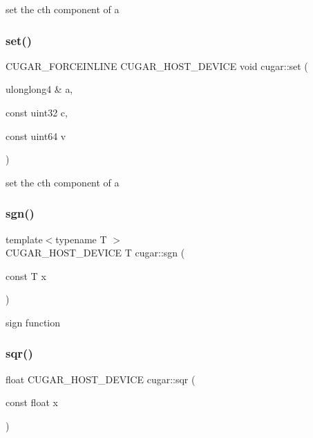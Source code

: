 set the c\textquotesingle{}th component of a \mbox{\label{group___basic_gac0bd2f6d0e83bfeddcd301d63e0bc750}} 
\subsubsection{\texorpdfstring{set()}{set()}\hspace{0.1cm}{\footnotesize\ttfamily [4/4]}}
{\footnotesize\ttfamily C\+U\+G\+A\+R\+\_\+\+F\+O\+R\+C\+E\+I\+N\+L\+I\+NE C\+U\+G\+A\+R\+\_\+\+H\+O\+S\+T\+\_\+\+D\+E\+V\+I\+CE void cugar\+::set (\begin{DoxyParamCaption}\item[{ulonglong4 \&}]{a,  }\item[{const uint32}]{c,  }\item[{const uint64}]{v }\end{DoxyParamCaption})}

set the c\textquotesingle{}th component of a \mbox{\label{group___basic_gaf4597603074c709d435ea876eac59e1b}} 
\subsubsection{\texorpdfstring{sgn()}{sgn()}}
{\footnotesize\ttfamily template$<$typename T $>$ \\
C\+U\+G\+A\+R\+\_\+\+H\+O\+S\+T\+\_\+\+D\+E\+V\+I\+CE T cugar\+::sgn (\begin{DoxyParamCaption}\item[{const T}]{x }\end{DoxyParamCaption})\hspace{0.3cm}{\ttfamily [inline]}}

sign function \mbox{\label{group___basic_gad7305249aeb2b830090e37dd335f0b6a}} 
\subsubsection{\texorpdfstring{sqr()}{sqr()}\hspace{0.1cm}{\footnotesize\ttfamily [1/2]}}
{\footnotesize\ttfamily float C\+U\+G\+A\+R\+\_\+\+H\+O\+S\+T\+\_\+\+D\+E\+V\+I\+CE cugar\+::sqr (\begin{DoxyParamCaption}\item[{const float}]{x }\end{DoxyParamCaption})\hspace{0.3cm}{\ttfamily [inline]}}

